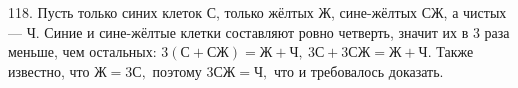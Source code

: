 118. Пусть только синих клеток С, только жёлтых Ж, сине-жёлтых СЖ, а чистых --- Ч. Синие и сине-жёлтые клетки составляют ровно четверть, значит их в 3 раза меньше, чем остальных: $3(\text{С}+\text{СЖ})=\text{Ж}+\text{Ч},\ 3\text{С}+3\text{СЖ}=\text{Ж}+\text{Ч}.$ Также известно, что $\text{Ж}=3\text{С},$ поэтому $3\text{СЖ}=\text{Ч},$ что и требовалось доказать.\\
